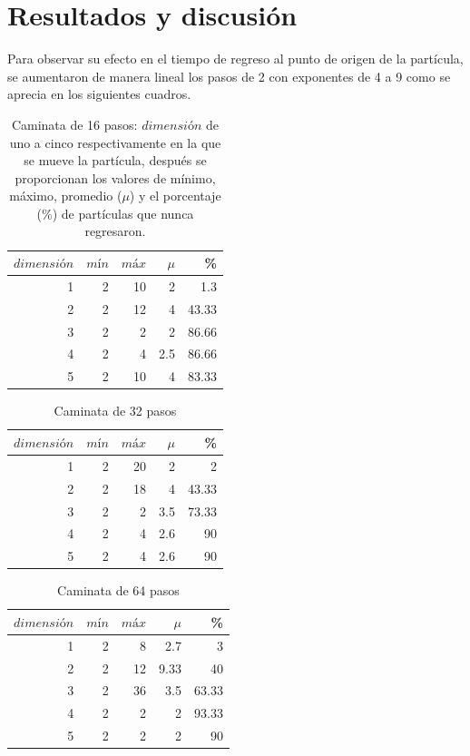 \documentclass[12pt]{amsart}
\begin{document}
\section{Resultados y discusión}
Para observar su efecto en el tiempo de regreso al punto de origen de la partícula, se aumentaron de manera lineal los pasos de 2 con exponentes de 4 a 9 como se aprecia en los siguientes cuadros. 
{
\bigskip
\medskip
\begin{table}[ht]
    \caption{Caminata de 16 pasos: $dimensión$ de uno a cinco respectivamente en la que se mueve la partícula, después se proporcionan los valores de mínimo, máximo, promedio ($\mu$) y el porcentaje (\%) de partículas que nunca regresaron.}
    \label{datos}
    \centering
    \begin{tabular}{|r|rrr|r|}
       \hline
        $dimensión$&$mín$&$máx$&$\mu$&\% \\
        \hline
        1 & 2 & 10 & 2 & 1.3 \\
        2 & 2 & 12 & 4 & 43.33 \\
        3 & 2 & 2 & 2 & 86.66 \\
        4 & 2 & 4 & 2.5 & 86.66 \\
        5 & 2 & 10 & 4 & 83.33\\
        \hline
    \end{tabular}
\end{table}
\bigskip

\begin{table}[ht]
    \caption{Caminata de 32 pasos}
    \label{datos}
    \centering
    \begin{tabular}{|r|rrr|r|}
       \hline
        $dimensión$&$mín$&$máx$&$\mu$&\% \\
        \hline
        1 & 2 & 20 & 2 & 2 \\
        2 & 2 & 18 & 4 & 43.33 \\
        3 & 2 & 2 & 3.5 & 73.33 \\
        4 & 2 & 4 & 2.6 & 90 \\
        5 & 2 & 4 & 2.6 & 90\\
        \hline
    \end{tabular}
\end{table}
\bigskip

\begin{table}[ht]
    \caption{Caminata de 64 pasos}
    \label{datos}
    \centering
    \begin{tabular}{|r|rrr|r|}
       \hline
        $dimensión$&$mín$&$máx$&$\mu$&\% \\
        \hline
        1 & 2 & 8 & 2.7 & 3 \\
        2 & 2 & 12 & 9.33 & 40 \\
        3 & 2 & 36 & 3.5 & 63.33 \\
        4 & 2 & 2 & 2 & 93.33 \\
        5 & 2 & 2 & 2 & 90\\
        \hline
    \end{tabular}
\end{table}
\bigskip

}
\end{document}

